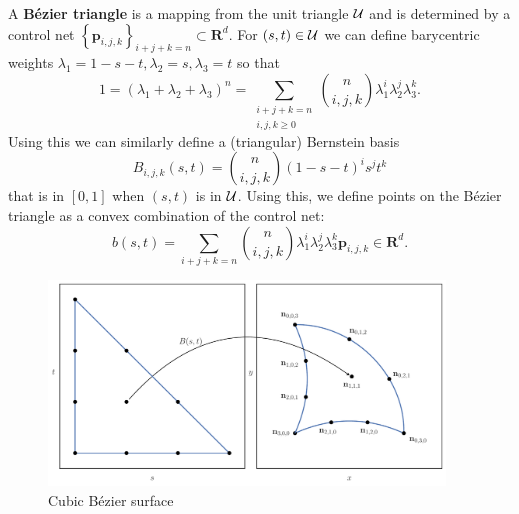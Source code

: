 A \textbf{B\'{e}zier triangle} is a mapping from the unit triangle
\(\mathcal{U}\) and is determined by a control net
\(\left\{\mathbf{p}_{i, j, k}\right\}_{i + j + k = n} \subset \mathbf{R}^d\).
For \((s, t) \in \mathcal{U}\) we can define barycentric weights
\(\lambda_1 = 1 - s - t, \lambda_2 = s, \lambda_3 = t\) so that
\begin{equation}
1 = \left(\lambda_1 + \lambda_2 + \lambda_3\right)^n =
  \sum_{\substack{i + j + k = n \\ i, j, k \geq 0}} \binom{n}{i, j, k}
  \lambda_1^i \lambda_2^j \lambda_3^k.
\end{equation}
Using this we can similarly define a (triangular) Bernstein basis
\begin{equation}
B_{i, j, k}(s, t) = \binom{n}{i, j, k} (1 - s - t)^i s^j t^k
\end{equation}
that is in \(\left[0, 1\right]\) when \((s, t)\) is in \(\mathcal{U}\).
Using this, we define points on the B\'{e}zier triangle as a
convex combination of the control net:
\begin{equation}
b(s, t) = \sum_{i + j + k = n} \binom{n}{i, j, k}
  \lambda_1^i \lambda_2^j \lambda_3^k
  \mathbf{p}_{i, j, k} \in \mathbf{R}^d.
\end{equation}

\begin{figure}
  \includegraphics[width=0.9375\textwidth]{../images/curved-mesh/main_figure01.pdf}
  \centering
  \caption{Cubic B\'{e}zier surface}
  \label{fig:cubic-bezier-example}
\end{figure}

